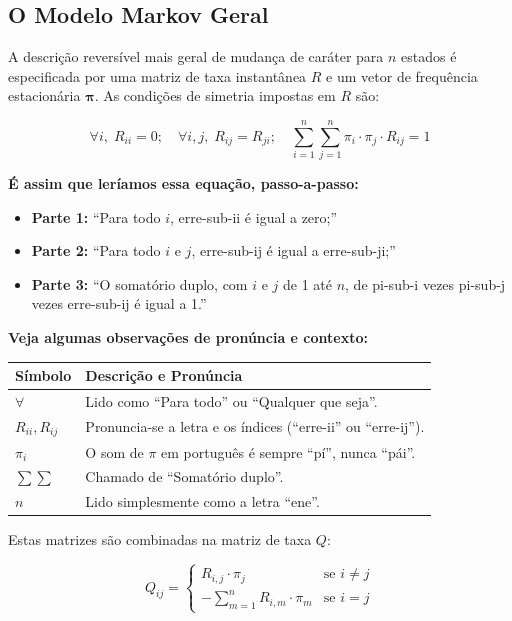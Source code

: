 \subsection{O Modelo Markov Geral}

A descrição reversível mais geral de mudança de caráter para $n$ estados é especificada por uma matriz de taxa instantânea $R$ e um vetor de frequência estacionária $\symbf{\pi}$. As condições de simetria impostas em $R$ são:

$$\forall i,\; R_{ii} = 0; \quad \forall i,j,\; R_{ij} = R_{ji}; \quad \sum_{i=1}^{n}\sum_{j=1}^{n} \pi_i \cdot \pi_j \cdot R_{ij} = 1$$

\textbf{É assim que leríamos essa equação, passo-a-passo:}

\begin{itemize}
    \item \textbf{Parte 1:} ``Para todo $i$, erre-sub-ii é igual a zero;''
    \item \textbf{Parte 2:} ``Para todo $i$ e $j$, erre-sub-ij é igual a erre-sub-ji;''
    \item \textbf{Parte 3:} ``O somatório duplo, com $i$ e $j$ de 1 até $n$, de pi-sub-i vezes pi-sub-j vezes erre-sub-ij é igual a 1.''
\end{itemize}

\textbf{Veja algumas observações de pronúncia e contexto:}

\begin{center}
\renewcommand{\arraystretch}{1.5}
\begin{tabular}{lp{10cm}}
\toprule
\textbf{Símbolo} & \textbf{Descrição e Pronúncia} \\
\midrule
$\forall$ & Lido como ``Para todo'' ou ``Qualquer que seja''. \\
$R_{ii}, R_{ij}$ & Pronuncia-se a letra e os índices (``erre-ii'' ou ``erre-ij''). \\
$\pi_i$ & O som de $\pi$ em português é sempre ``pí'', nunca ``pái''. \\
$\sum \sum$ & Chamado de ``Somatório duplo''. \\
$n$ & Lido simplesmente como a letra ``ene''. \\
\bottomrule
\end{tabular}
\end{center}

Estas matrizes são combinadas na matriz de taxa $Q$:

$$Q_{ij} = \begin{cases} R_{i,j} \cdot \pi_j & \text{se } i \neq j \\ -\sum_{m=1}^{n} R_{i,m} \cdot \pi_m & \text{se } i = j \end{cases}$$

